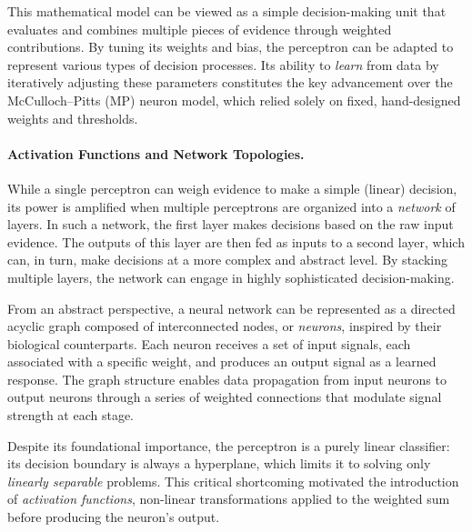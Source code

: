 This mathematical model can be viewed as a simple decision-making unit that
evaluates and combines multiple pieces of evidence through weighted
contributions.
By tuning its weights and bias, the perceptron can be adapted to represent
various types of decision processes.
Its ability to \emph{learn} from data by iteratively adjusting these
parameters constitutes the key advancement over the McCulloch--Pitts (MP)
neuron model, which relied solely on fixed, hand-designed weights and
thresholds.

\paragraph{Activation Functions and Network Topologies.}
While a single perceptron can weigh evidence to make a simple (linear)
decision, its power is amplified when multiple perceptrons are organized into
a \emph{network} of layers. 
In such a network, the first layer makes decisions based on the raw
input evidence.
The outputs of this layer are then fed as inputs to a second layer, which can,
in turn, make decisions at a more complex and abstract level.
By stacking multiple layers, the network can engage in highly sophisticated
decision-making.

From an abstract perspective, a neural network can be represented as a
directed acyclic graph composed of interconnected nodes, or
\emph{neurons}, inspired by their biological counterparts.
Each neuron receives a set of input signals, each associated with a
specific weight, and produces an output signal as a learned response.
The graph structure enables data propagation from input neurons to output
neurons through a series of weighted connections that modulate signal
strength at each stage.

Despite its foundational importance, the perceptron is a purely linear classifier: 
its decision boundary is always a hyperplane, which limits it to solving only
\emph{linearly separable} problems.
This critical shortcoming motivated the introduction of \emph{activation
functions}, non-linear transformations applied to the weighted sum before
producing the neuron's output.

